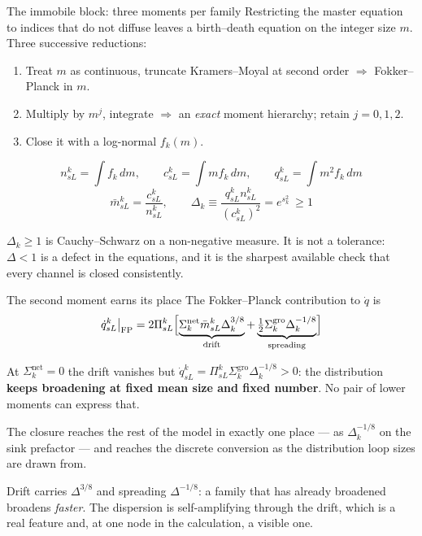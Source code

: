 \documentclass[aspectratio=169,10pt]{beamer}
\newcommand{\foot}[1]{\par\vspace{1ex}%
  \begingroup\footnotesize\raggedright #1\par\endgroup}
\begin{document}
\begin{frame}{The immobile block: three moments per family}
\small
Restricting the master equation to indices that do not diffuse leaves a
birth--death equation on the integer size $m$. Three successive reductions:
\begin{enumerate}\small
  \item Treat $m$ as continuous, truncate Kramers--Moyal at second order
        $\Rightarrow$ Fokker--Planck in $m$.
  \item Multiply by $m^{j}$, integrate $\Rightarrow$ an \emph{exact} moment
        hierarchy; retain $j=0,1,2$.
  \item Close it with a log-normal $f_k(m)$.
\end{enumerate}
\[
  n^k_{sL}=\!\int\! f_k\,dm,\qquad
  c^k_{sL}=\!\int\! m f_k\,dm,\qquad
  q^k_{sL}=\!\int\! m^{2} f_k\,dm
\]
\[
  \bar m^k_{sL}=\frac{c^k_{sL}}{n^k_{sL}},\qquad
  \Delta_k\equiv\frac{q^k_{sL}n^k_{sL}}{(c^k_{sL})^{2}}=e^{s_k^{2}}\ \ge 1
\]
\foot{$\Delta_k\ge1$ is Cauchy--Schwarz on a non-negative measure. It is not a
tolerance: $\Delta<1$ is a defect in the equations, and it is the sharpest
available check that every channel is closed consistently.}
\end{frame}

\begin{frame}{The second moment earns its place}
\small
The Fokker--Planck contribution to $\dot q$ is
\[
  \dot q^k_{sL}\big|_{\mathrm{FP}}
  = 2\Pi^k_{sL}\Bigl[\underbrace{\Sigma^{\mathrm{net}}_k\bar m^k_{sL}\Delta_k^{3/8}}_{\text{drift}}
    +\underbrace{\tfrac12\Sigma^{\mathrm{gro}}_k\Delta_k^{-1/8}}_{\text{spreading}}\Bigr]
\]
\begin{block}{}
At $\Sigma^{\mathrm{net}}_k=0$ the drift vanishes but
$\dot q^k_{sL}=\Pi^k_{sL}\Sigma^{\mathrm{gro}}_k\Delta_k^{-1/8}>0$: the
distribution \textbf{keeps broadening at fixed mean size and fixed number}.
No pair of lower moments can express that.
\end{block}
\vspace{0.5ex}
The closure reaches the rest of the model in exactly one place --- as
$\Delta_k^{-1/8}$ on the sink prefactor --- and reaches the discrete conversion
as the distribution loop sizes are drawn from.
\foot{Drift carries $\Delta^{3/8}$ and spreading $\Delta^{-1/8}$: a family that
has already broadened broadens \emph{faster}. The dispersion is self-amplifying
through the drift, which is a real feature and, at one node in the calculation,
a visible one.}
\end{frame}
\end{document}
